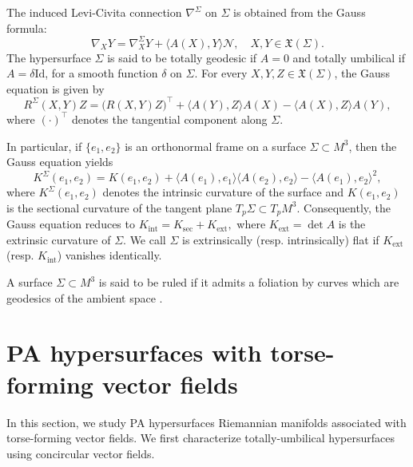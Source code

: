 \documentclass[12pt,reqno]{amsart}
\def\n{\mathcal N}
\def\x{\mathfrak X}
\theoremstyle{definition}
\begin{document}
The induced Levi-Civita connection $\nabla^{\Sigma}$ on $\Sigma$ is obtained from the Gauss formula:
$$
\nabla_XY=\nabla^{\Sigma}_XY+\langle A(X),Y\rangle \n, \quad X,Y \in\x(\Sigma).
$$
The hypersurface $\Sigma$ is said to be totally geodesic if $A=0$ and totally umbilical if $A=\delta \mbox{Id}$, for a smooth function $\delta$ on $\Sigma$. For every $X,Y,Z\in \mathfrak{X}(\Sigma)$, the Gauss equation is given by
$$
R^\Sigma(X,Y)Z
=
\big(R(X,Y)Z\big)^\top
+
\langle A(Y),Z\rangle A(X)
-
\langle A(X),Z\rangle A(Y),
$$
where $(\cdot)^\top$ denotes the tangential component along $\Sigma$.

In particular, if $\{e_1,e_2\}$ is an orthonormal frame on a surface $\Sigma\subset M^3$, then the Gauss equation yields
$$
K^\Sigma(e_1,e_2)=K(e_1,e_2)+\langle A(e_1),e_1\rangle \langle A(e_2),e_2\rangle-\langle A(e_1),e_2\rangle^2,
$$
where $K^\Sigma(e_1,e_2)$ denotes the intrinsic curvature of the surface and $K(e_1,e_2)$ is the sectional curvature of the tangent plane $T_p\Sigma \subset T_pM^3$. Consequently, the Gauss equation reduces to $
K_{\mathrm{int}}=K_{\mathrm{sec}}+K_{\mathrm{ext}}, $ where $K_{\mathrm{ext}} = \det A$ is the extrinsic curvature of $\Sigma$. We call $\Sigma$  is extrinsically (resp. intrinsically) flat if $K_{\mathrm{ext}}$ (resp. $K_{\mathrm{int}}$) vanishes identically.

A surface $\Sigma \subset M^3$ is said to be ruled if it admits a foliation by curves which are geodesics of the ambient space \cite{lrs}.

\section{PA hypersurfaces with torse-forming vector fields} \label{sec3}


In this section, we study PA hypersurfaces Riemannian manifolds associated with torse-forming vector fields. We first characterize totally-umbilical hypersurfaces using concircular vector fields.
\end{document}
